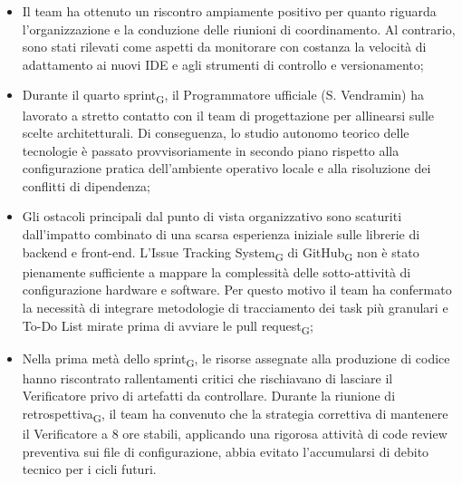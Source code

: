\documentclass[a4paper, 10pt, colorlinks=true, linkcolor=black, urlcolor=blue, citecolor=blue, hidelinks]{article}
\begin{document}
\begin{itemize}
    \item Il team ha ottenuto un riscontro ampiamente positivo per quanto riguarda l'organizzazione e la conduzione delle riunioni di coordinamento. Al contrario, sono stati rilevati come aspetti da monitorare con costanza la velocità di adattamento ai nuovi IDE e agli strumenti di controllo e versionamento;
    \item Durante il quarto sprint\textsubscript{G}, il Programmatore ufficiale (S. Vendramin) ha lavorato a stretto contatto con il team di progettazione per allinearsi sulle scelte architetturali. Di conseguenza, lo studio autonomo teorico delle tecnologie è passato provvisoriamente in secondo piano rispetto alla configurazione pratica dell'ambiente operativo locale e alla risoluzione dei conflitti di dipendenza;
    \item Gli ostacoli principali dal punto di vista organizzativo sono scaturiti dall'impatto combinato di una scarsa esperienza iniziale sulle librerie di backend e front-end. L'Issue Tracking System\textsubscript{G} di GitHub\textsubscript{G} non è stato pienamente sufficiente a mappare la complessità delle sotto-attività di configurazione hardware e software. Per questo motivo il team ha confermato la necessità di integrare metodologie di tracciamento dei task più granulari e To-Do List mirate prima di avviare le pull request\textsubscript{G};
    \item Nella prima metà dello sprint\textsubscript{G}, le risorse assegnate alla produzione di codice hanno riscontrato rallentamenti critici che rischiavano di lasciare il Verificatore privo di artefatti da controllare. Durante la riunione di retrospettiva\textsubscript{G}, il team ha convenuto che la strategia correttiva di mantenere il Verificatore a 8 ore stabili, applicando una rigorosa attività di code review preventiva sui file di configurazione, abbia evitato l'accumularsi di debito tecnico per i cicli futuri.
\end{itemize}
\end{document}
